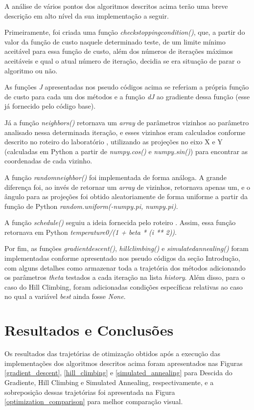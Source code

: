 \documentclass[conference]{IEEEtran}
\begin{document}
A análise de vários pontos dos algoritmos descritos acima terão uma breve descrição em alto nível da sua implementação a seguir. 

Primeiramente, foi criada uma função \textit{check\underline{\space}stopping\underline{\space}condition()}, que, a partir do valor da função de custo naquele determinado teste, de um limite mínimo aceitável para essa função de custo, além dos números de iterações máximos aceitáveis e qual o atual número de iteração, decidia se era situação de parar o algoritmo ou não.

As funções \textit{J} apresentadas nos pseudo códigos acima se referiam a própria função de custo para cada um dos métodos e a função \textit{dJ} ao gradiente dessa função (esse já fornecido pelo código base).

Já a função \textit{neighbors()} retornava um \textit{array} de parâmetros vizinhos ao parâmetro analisado nessa determinada iteração, e esses vizinhos eram calculados conforme descrito no roteiro do laboratório \cite{b1}, utilizando as projeções no eixo X e Y (calculadas em Python a partir de \textit{numpy.cos()} e \textit{numpy.sin()}) para encontrar as coordenadas de cada vizinho.

A função \textit{random\underline{\space}neighbor()} foi implementada de forma análoga. A grande diferença foi, ao invés de retornar um \textit{array} de vizinhos, retornava apenas um, e o ângulo para as projeções foi obtido aleatoriamente de forma uniforme a partir da função de Python \textit{random.uniform(-numpy.pi, numpy.pi)}.

A função \textit{schedule()} seguiu a ideia fornecida pelo roteiro \cite{b1}. Assim, essa função retornava em Python \textit{temperature0/(1 + beta * (i ** 2))}.

Por fim, as funções \textit{gradient\underline{\space}descent()}, \textit{hill\underline{\space}climbing()} e \textit{simulated\underline{\space}annealing()} foram implementadas conforme apresentado nos pseudo códigos da seção Introdução, com alguns detalhes como armazenar toda a trajetória dos métodos adicionando os parâmetros \textit{theta} testados a cada iteração na lista \textit{history}. Além disso, para o caso do Hill Climbing, foram adicionadas condições específicas relativas ao caso no qual a variável \textit{best} ainda fosse \textit{None}. 

\section{Resultados e Conclusões}
Os resultados das trajetórias de otimização obtidos após a execução das implementações dos algoritmos descritos acima foram apresentados nas Figuras \ref{gradient_descent}, \ref{hill_climbing} e \ref{simulated_annealing} para Descida do Gradiente, Hill Climbing e Simulated Annealing, respectivamente, e a sobreposição dessas trajetórias foi apresentada na Figura \ref{optimization_comparison} para melhor comparação visual.
\end{document}
